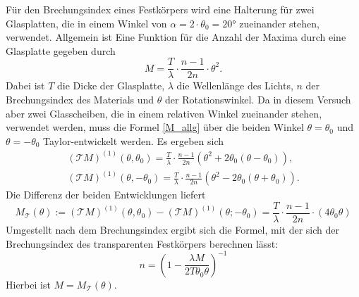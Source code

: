 Für den Brechungsindex eines Festkörpers wird eine Halterung für zwei Glasplatten,
die in einem Winkel von $\alpha = 2\cdot\theta_0 = 20°$ zueinander stehen, verwendet.
Allgemein ist Eine Funktion für die Anzahl der Maxima durch eine Glasplatte gegeben durch
\begin{equation}
  M = \frac{T}{\lambda}\cdot\frac{n-1}{2n}\cdot\theta^2.
\label{M_allg}
\end{equation}
Dabei ist $T$ die Dicke der Glasplatte, $\lambda$ die Wellenlänge des Lichts, $n$ der Brechungsindex des Materials und $\theta$ der Rotationswinkel.
Da in diesem Versuch aber zwei Glasscheiben, die in einem relativen Winkel zueinander stehen, verwendet werden,
muss die Formel \eqref{M_allg} über die beiden Winkel $\theta = \theta_0$ und $\theta = -\theta_0$ Taylor-entwickelt werden.
Es ergeben sich
\begin{gather*}
  (\mathcal{T}M)^{(1)}(\theta,\theta_0) = \frac{T}{\lambda}\cdot\frac{n-1}{2n}(\theta^2 + 2\theta_0(\theta-\theta_0)),\\
  (\mathcal{T}M)^{(1)}(\theta,-\theta_0) = \frac{T}{\lambda}\cdot\frac{n-1}{2n}(\theta^2 - 2\theta_0(\theta+\theta_0)).
\end{gather*}
Die Differenz der beiden Entwicklungen liefert
\begin{equation*}
  M_{\mathcal{T}}(\theta) :=
  (\mathcal{T}M)^{(1)}(\theta,\theta_0) - (\mathcal{T}M)^{(1)}(\theta;-\theta_0)
   = \frac{T}{\lambda}\cdot\frac{n-1}{2n}\cdot(4\theta_0\theta)
 \end{equation*}
 Umgestellt nach dem Brechungsindex ergibt sich die Formel,
 mit der sich der Brechungsindex des transparenten Festkörpers berechnen lässt:
\begin{equation}
  n = \left( 1 - \frac{\lambda{M}}{2T\theta_0\theta} \right)^{-1}
\label{eqn:glas}
\end{equation}
Hierbei ist $M = M_{\mathcal{T}}(\theta)$.
